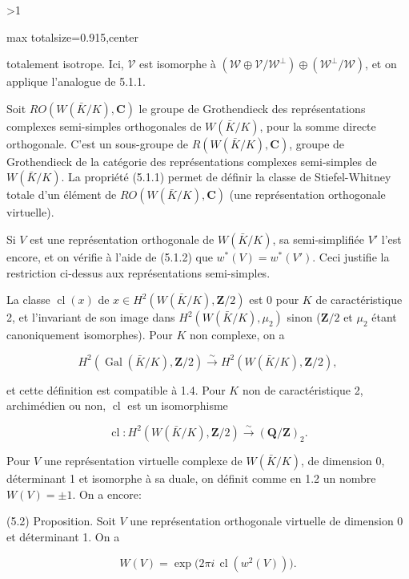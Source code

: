 \documentclass[9pt,twoside]{extarticle}
\newcommand{\EditionPage}[3]{%
  \ifnum#1>1\clearpage\fi
  \pdfbookmark[1]{Printed folio #2}{fr-folio-#2}%
  \hypertarget{fr-page-#1}{}%
  \noindent\begin{adjustbox}{max totalsize={\textwidth}{0.915\textheight},center}
  \begin{minipage}[t]{\textwidth}
  \fontsize{8.45}{10.05}\selectfont\justifying
  #3
  \end{minipage}
  \end{adjustbox}%
}
\begin{document}
\EditionPage{16}{314}{%
totalement isotrope. Ici, \(\mathscr V\) est isomorphe à \((\mathscr W\oplus\mathscr V/\mathscr W^\perp)\oplus(\mathscr W^\perp/\mathscr W)\), et on applique l’analogue de 5.1.1.\par

Soit \(RO(W(\bar K/K),\mathbf C)\) le groupe de Grothendieck des représentations complexes semi-simples orthogonales de \(W(\bar K/K)\), pour la somme directe orthogonale. C’est un sous-groupe de \(R(W(\bar K/K),\mathbf C)\), groupe de Grothendieck de la catégorie des représentations complexes semi-simples de \(W(\bar K/K)\). La propriété (5.1.1) permet de définir la classe de Stiefel-Whitney totale d’un élément de \(RO(W(\bar K/K),\mathbf C)\) (une représentation orthogonale virtuelle).\par

Si \(V\) est une représentation orthogonale de \(W(\bar K/K)\), sa semi-simplifiée \(V'\) l’est encore, et on vérifie à l’aide de (5.1.2) que \(w^*(V)=w^*(V')\). Ceci justifie la restriction ci-dessus aux représentations semi-simples.\par

La classe \(\operatorname{cl}(x)\) de \(x\in H^2(W(\bar K/K),\mathbf Z/2)\) est 0 pour \(K\) de caractéristique 2, et l’invariant de son image dans \(H^2(W(\bar K/K),\mu_2)\) sinon (\(\mathbf Z/2\) et \(\mu_2\) étant canoniquement isomorphes). Pour \(K\) non complexe, on a\par

\[
H^2(\operatorname{Gal}(\bar K/K),\mathbf Z/2)\xrightarrow{\sim}H^2(W(\bar K/K),\mathbf Z/2),
\]

et cette définition est compatible à 1.4. Pour \(K\) non de caractéristique 2, archimédien ou non, \(\operatorname{cl}\) est un isomorphisme\par

\[
\operatorname{cl}:H^2(W(\bar K/K),\mathbf Z/2)\xrightarrow{\sim}(\mathbf Q/\mathbf Z)_2.
\]

Pour \(V\) une représentation virtuelle complexe de \(W(\bar K/K)\), de dimension 0, déterminant 1 et isomorphe à sa duale, on définit comme en 1.2 un nombre \(W(V)=\pm1\). On a encore:\par

(5.2) Proposition. Soit \(V\) une représentation orthogonale virtuelle de dimension 0 et déterminant 1. On a\par

\[
W(V)=\exp\bigl(2\pi i\,\operatorname{cl}(w^2(V))\bigr).
\]

}
\end{document}
